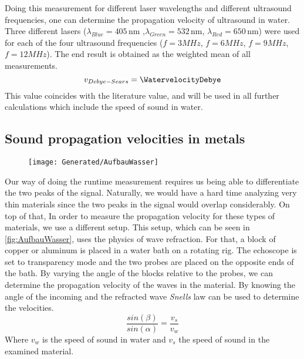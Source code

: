 \documentclass[a4paper,10pt,twocolumn]{article}
\begin{document}
    Doing this measurement for different laser wavelengths and different ultrasound frequencies, one can determine the propagation velocity of ultrasound in water.
    Three different lasers ($ \lambda_{Blue} = 405\,$nm ,$ \lambda_{Green} = 532\,$nm, $ \lambda_{Red} = 650\,$nm) were used for each of the four ultrasound frequencies ($f=3MHz$, $f=6MHz$, $f=9MHz$, $f=12MHz$).
    The end result is obtained as the weighted mean of all measurements.
    \begin{equation}\label{eq:VelocityDebyeValue}
        v_{Debye-Sears} = \WatervelocityDebye
    \end{equation}
    This value coincides with the literature value, and will be used in all further calculations which include the speed of sound in water.
    
    \subsection{Sound propagation velocities in metals}\label{propagationInMetals}
    \begin{figure}
        \begin{center}
        \texttt{[image: Generated/AufbauWasser]}
            \caption[]{}
            \label{fig:AufbauWasser}
        \end{center}
    \end{figure}    
    Our way of doing the runtime measurement requires us being able to differentiate the two peaks of the signal.
    Naturally, we would have a hard time analyzing very thin materials since the two peaks in the signal would overlap considerably.
    On top of that, 
    In order to measure the propagation velocity for these types of materials, we use a different setup.
    This setup, which can be seen in \autoref{fig:AufbauWasser}, uses the physics of wave refraction.
    For that, a block of copper or aluminum is placed in a water bath on a rotating rig.
    The echoscope is set to transparency mode and the two probes are placed on the opposite ends of the bath.
    By varying the angle of the blocks relative to the probes, we can determine the propagation velocity of the waves in the material.
    By knowing the angle of the incoming and the refracted wave \textit{Snells} law can be used to determine the velocities.
    \begin{equation}\label{eg:SnellLaw}
        \frac{sin(\beta)}{sin(\alpha)} = \frac{v_s}{v_w}
    \end{equation}
    Where $v_w$ is the speed of sound in water and $v_s$ the speed of sound in the examined material.
\end{document}
